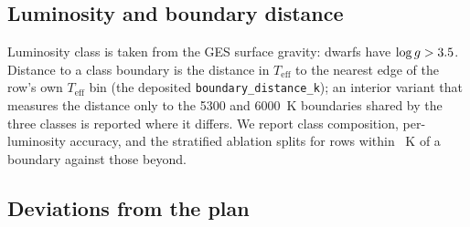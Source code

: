 \documentclass[11pt,a4paper]{article}
\newcommand{\Teff}{$T_{\mathrm{eff}}$\xspace}
\begin{document}
\subsection{Luminosity and boundary distance}

Luminosity class is taken from the GES surface gravity: dwarfs have $\log g > 3.5$. Distance to a class boundary is the distance in \Teff to the nearest edge of the row's own \Teff bin (the deposited \texttt{boundary\_distance\_k}); an interior variant that measures the distance only to the 5300 and 6000~K boundaries shared by the three classes is reported where it differs. We report class composition, per-luminosity accuracy, and the stratified ablation splits for rows within \bdCut~K of a boundary against those beyond.

\subsection{Deviations from the plan}
\label{subsec:deviations}
\end{document}
